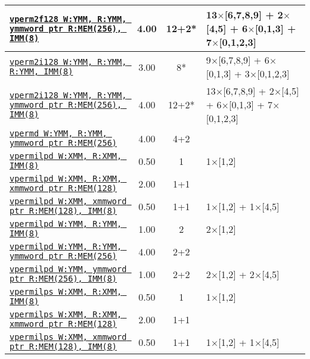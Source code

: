 \documentclass[a4paper,english,fontsize=9]{scrartcl}
\begin{document}
\begin{longtable}{p{}ccL{.25\textwidth}}
  \midrule
  \texttt{\href{https://felixcloutier.com/x86/VPERM2F128.html}{vperm2f128 W:YMM, R:YMM, ymmword ptr R:MEM(256), IMM(8)}} & 4.00 & 12+2* & 13\(\times\)[6,7,8,9] + 2\(\times\)[4,5] + 6\(\times\)[0,1,3] + 7\(\times\)[0,1,2,3] \\
  \midrule
  \texttt{\href{https://felixcloutier.com/x86/VPERM2I128.html}{vperm2i128 W:YMM, R:YMM, R:YMM, IMM(8)}} & 3.00 & 8* & 9\(\times\)[6,7,8,9] + 6\(\times\)[0,1,3] + 3\(\times\)[0,1,2,3] \\
  \midrule
  \texttt{\href{https://felixcloutier.com/x86/VPERM2I128.html}{vperm2i128 W:YMM, R:YMM, ymmword ptr R:MEM(256), IMM(8)}} & 4.00 & 12+2* & 13\(\times\)[6,7,8,9] + 2\(\times\)[4,5] + 6\(\times\)[0,1,3] + 7\(\times\)[0,1,2,3] \\
  \midrule
  \texttt{\href{https://felixcloutier.com/x86/VPERMD:VPERMW.html}{vpermd W:YMM, R:YMM, ymmword ptr R:MEM(256)}} & 4.00 & 4+2 &  \\
  \midrule
  \texttt{\href{https://felixcloutier.com/x86/VPERMILPD.html}{vpermilpd W:XMM, R:XMM, IMM(8)}} & 0.50 & 1 & 1\(\times\)[1,2] \\
  \midrule
  \texttt{\href{https://felixcloutier.com/x86/VPERMILPD.html}{vpermilpd W:XMM, R:XMM, xmmword ptr R:MEM(128)}} & 2.00 & 1+1 &  \\
  \midrule
  \texttt{\href{https://felixcloutier.com/x86/VPERMILPD.html}{vpermilpd W:XMM, xmmword ptr R:MEM(128), IMM(8)}} & 0.50 & 1+1 & 1\(\times\)[1,2] + 1\(\times\)[4,5] \\
  \midrule
  \texttt{\href{https://felixcloutier.com/x86/VPERMILPD.html}{vpermilpd W:YMM, R:YMM, IMM(8)}} & 1.00 & 2 & 2\(\times\)[1,2] \\
  \midrule
  \texttt{\href{https://felixcloutier.com/x86/VPERMILPD.html}{vpermilpd W:YMM, R:YMM, ymmword ptr R:MEM(256)}} & 4.00 & 2+2 &  \\
  \midrule
  \texttt{\href{https://felixcloutier.com/x86/VPERMILPD.html}{vpermilpd W:YMM, ymmword ptr R:MEM(256), IMM(8)}} & 1.00 & 2+2 & 2\(\times\)[1,2] + 2\(\times\)[4,5] \\
  \midrule
  \texttt{\href{https://felixcloutier.com/x86/VPERMILPS.html}{vpermilps W:XMM, R:XMM, IMM(8)}} & 0.50 & 1 & 1\(\times\)[1,2] \\
  \midrule
  \texttt{\href{https://felixcloutier.com/x86/VPERMILPS.html}{vpermilps W:XMM, R:XMM, xmmword ptr R:MEM(128)}} & 2.00 & 1+1 &  \\
  \midrule
  \texttt{\href{https://felixcloutier.com/x86/VPERMILPS.html}{vpermilps W:XMM, xmmword ptr R:MEM(128), IMM(8)}} & 0.50 & 1+1 & 1\(\times\)[1,2] + 1\(\times\)[4,5] \\

\end{longtable}
\end{document}
